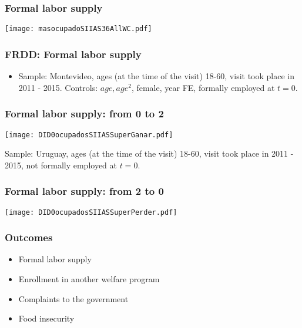 \documentclass{beamer}
\begin{document}
\begin{frame}[shrink=5, label=masocupadoSIIAS36AllWC]
\frametitle{Formal labor supply}
\begin{center}
	\texttt{[image: masocupadoSIIAS36AllWC.pdf]}
	\label{masocupadoSIIAS36AllWC}
\end{center}
\hyperlink{masocupadoSIIAS36AllSC}{}
\hyperlink{masocupadoSIIAS36AllPlaSC}{}
\hyperlink{masocupadoSIIAS36AllPlaWC}{}
\end{frame}

\begin{frame}[shrink=20, label=FRDDLabor]
\frametitle{FRDD: Formal labor supply}
\medskip
\medskip
\medskip
\medskip
\begin{figure}
	
\end{figure}
\begin{itemize}
	\item Sample: Montevideo, ages (at the time of the visit) 18-60, visit took place in 2011 - 2015. Controls: $age, age^2$, female, year FE, formally employed at $t=0$.
\end{itemize}
\hyperlink{RDDrobustness}{}
\end{frame}


\begin{frame}[label=flabor02]
\frametitle{Formal labor supply: from 0 to 2}
\begin{center}
	\texttt{[image: DID0ocupadosSIIASSuperGanar.pdf]}
	\label{DID0ocupadosSIIASSuperGanar}
\end{center}

{\tiny Sample: Uruguay, ages (at the time of the visit) 18-60, visit took place in 2011 - 2015, not formally employed at $t=0$.} 
\hyperlink{flabor01}{}
\end{frame}

\begin{frame}[label=flabor20]
\frametitle{Formal labor supply: from 2 to 0}
\begin{center}
	\texttt{[image: DID0ocupadosSIIASSuperPerder.pdf]}
	\label{DID0ocupadosSIIASSuperPerder}
\end{center}
\hyperlink{flabor10}{}
\end{frame}

\begin{frame}
\frametitle{Outcomes}
\begin{itemize}	
	\item {\color{gray}Formal labor supply}
	\item Enrollment in another welfare program
	\item {\color{gray}Complaints to the government}
	\item {\color{gray}Food insecurity}
\end{itemize}
\end{frame}
\end{document}
